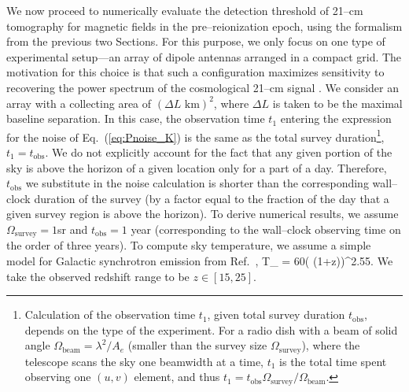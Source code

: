 We now proceed to numerically evaluate the detection threshold of 21--cm tomography for magnetic fields in the pre--reionization epoch, using the formalism from the previous two Sections. For this purpose, we only focus on one type of experimental setup---an array of dipole antennas arranged in a compact grid. The motivation for this choice is that such a configuration maximizes sensitivity to recovering the power spectrum of the cosmological 21--cm signal \cite{2009PhRvD..79h3530T,2015AAS...22532803D}. We consider an array with a collecting area of $(\Delta L\text{ km})^2$, where $\Delta L$ is taken to be the maximal baseline separation. In this case, the observation time $t_1$ entering the expression for the noise of Eq.~(\ref{eq:Pnoise_K}) is the same as the total survey duration\footnote{Calculation of the observation time $t_1$, given total survey duration $t_\text{obs}$, depends on the type of the experiment. For a radio dish with a beam of solid angle $\Omega_\text{beam}=\lambda^2/A_e$ (smaller than the survey size $\Omega_\text{survey}$), where the telescope scans the sky one beamwidth at a time, $t_1$ is the total time spent observing one $(u,v)$ element, and thus $t_1=t_\text{obs}\Omega_\text{survey}/\Omega_\text{beam}$.}, $t_1=t_\text{obs}$. We do not explicitly account for the fact that any given portion of the sky is above the horizon of a given location only for a part of a day. Therefore, $t_\text{obs}$ we substitute in the noise calculation is shorter than the corresponding wall--clock duration of the survey (by a factor equal to the fraction of the day that a given survey region is above the horizon). To derive numerical results, we assume $\Omega_\text{survey}=1$sr and $t_\text{obs}=1$ year (corresponding to the wall--clock observing time on the order of three years). To compute sky temperature, we assume a simple model for Galactic synchrotron emission from Ref.~\cite{2008PhRvD..78b3529M}, 
\beq
T_  = 60\left( (1+z)\right)^{2.55}\text{   [K]}.
\label{eq:tsys}
\eeq
We take the observed redshift range to be $z\in[15,25]$. 

